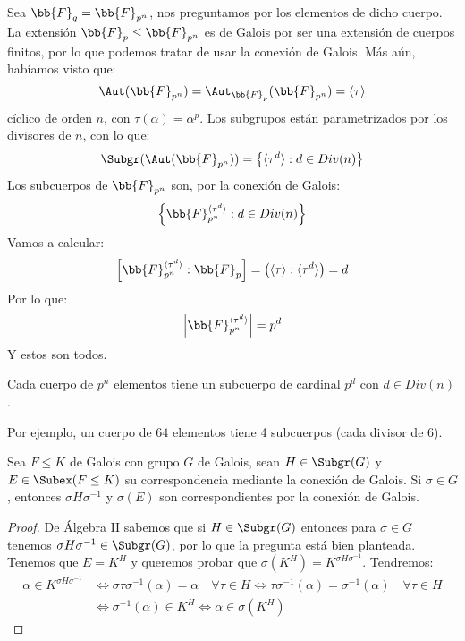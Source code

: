 \begin{ejemplo}
    Sea $\bb{F}_q = \bb{F}_{p^n}$, nos preguntamos por los elementos de dicho cuerpo. La extensión $\bb{F}_p\leq \bb{F}_{p^n}$ es de Galois por ser una extensión de cuerpos finitos, por lo que podemos tratar de usar la conexión de Galois. Más aún, habíamos visto que:
    \begin{equation*}
        \Aut(\bb{F}_{p^n}) = \Aut_{\bb{F}_p}(\bb{F}_{p^n}) = \langle \tau \rangle 
    \end{equation*}
    cíclico de orden $n$, con $\tau(\alpha)=\alpha^p$. Los subgrupos están parametrizados por los divisores de $n$, con lo que:
    \begin{equation*}
        \Subgr(\Aut(\bb{F}_{p^n})) = \left\{\langle \tau^d \rangle : d \in Div(n) \right\}
    \end{equation*}
    Los subcuerpos de $\bb{F}_{p^n}$ son, por la conexión de Galois:
    \begin{equation*}
        \left\{\bb{F}_{p^n}^{\langle \tau^d \rangle }: d\in Div(n)\right\}
    \end{equation*}
    Vamos a calcular:
    \begin{equation*}
        \left[\bb{F}_{p^n}^{\langle \tau^d \rangle }:\bb{F}_p\right] = \left(\langle \tau \rangle : \langle \tau^d \rangle \right) = d
    \end{equation*}
    Por lo que:
    \begin{equation*}
        \left|\bb{F}_{p^n}^{\langle \tau^d \rangle }\right| = p^d
    \end{equation*}
    Y estos son todos.

    \noindent
    Cada cuerpo de $p^n$ elementos tiene un subcuerpo de cardinal $p^d$ con $d\in Div(n)$.

    \noindent
    Por ejemplo, un cuerpo de $64$ elementos tiene 4 subcuerpos (cada divisor de 6).
\end{ejemplo}


\begin{lema}
    Sea $F\leq K$ de Galois con grupo $G$ de Galois, sean $H\in \Subgr(G)$ y $E\in \Subex(F\leq K)$ su correspondencia mediante la conexión de Galois. Si $\sigma\in G$, entonces $\sigma H \sigma^{-1}$ y $\sigma(E)$ son correspondientes por la conexión de Galois.
    \begin{proof}
        De Álgebra II sabemos que si $H\in \Subgr(G)$ entonces para $\sigma\in G$ tenemos $\sigma H\sigma^{-1}\in \Subgr(G)$, por lo que la pregunta está bien planteada. Tenemos que $E = K^H$ y queremos probar que $\sigma(K^H) = K^{\sigma H \sigma^{-1}}$. Tendremos:
        \begin{align*}
            \alpha \in K^{\sigma H \sigma^{-1}} &\Longleftrightarrow \sigma\tau \sigma^{-1}(\alpha) = \alpha \quad \forall \tau \in H \Longleftrightarrow \tau\sigma^{-1}(\alpha) = \sigma^{-1}(\alpha) \quad \forall \tau \in H \\ &\Longleftrightarrow \sigma^{-1}(\alpha) \in K^H \Longleftrightarrow \alpha \in \sigma(K^H)
        \end{align*}
    \end{proof}
\end{lema}

